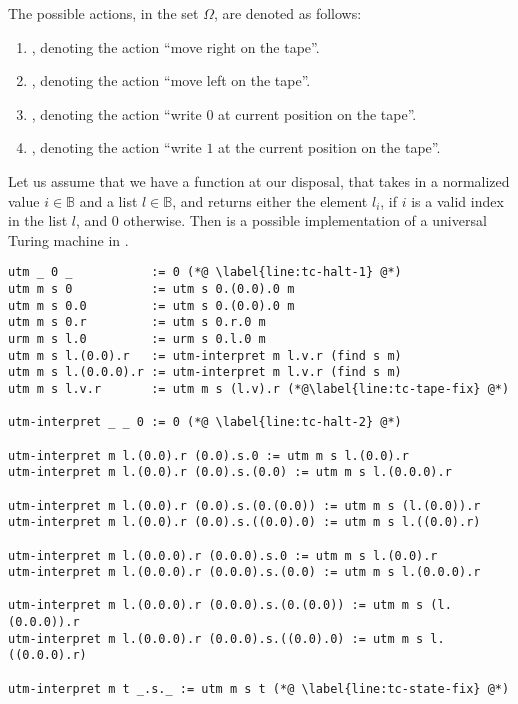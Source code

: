 \begin{definition} The possible actions, in the set $\Omega$, are denoted as follows:

\begin{enumerate}

\item {}, denoting the action ``move right on the tape''.

\item {}, denoting the action ``move left on the tape''.

\item {}, denoting the action ``write $0$ at current position on the
tape''.

\item {}, denoting the action ``write $1$ at the current position on
the tape''.

\end{enumerate}

\end{definition}

Let us assume that we have a function  at our disposal, that takes
in a normalized value $i\in\mathbb{B}$ and a list $l\in\mathbb{B}$, and returns
either the element $l_i$, if $i$ is a valid index in the list $l$, and $0$
otherwise. Then  is a possible
implementation of a universal Turing machine in \D{}.

\begin{lstlisting}[label=listing:turing-completeness,
  caption={A universal Turing machine in \D{}. \mono{m} stands for $M$, \mono{s}
  stands for $\lambda$, \mono{t} stands for tape, and \mono{l} and \mono{r}
  stand for left and right, respectively.}]
utm _ 0 _           := 0 (*@ \label{line:tc-halt-1} @*)
utm m s 0           := utm s 0.(0.0).0 m
utm m s 0.0         := utm s 0.(0.0).0 m
utm m s 0.r         := utm s 0.r.0 m
urm m s l.0         := urm s 0.l.0 m
utm m s l.(0.0).r   := utm-interpret m l.v.r (find s m)
utm m s l.(0.0.0).r := utm-interpret m l.v.r (find s m)
utm m s l.v.r       := utm m s (l.v).r (*@\label{line:tc-tape-fix} @*)

utm-interpret _ _ 0 := 0 (*@ \label{line:tc-halt-2} @*)

utm-interpret m l.(0.0).r (0.0).s.0 := utm m s l.(0.0).r
utm-interpret m l.(0.0).r (0.0).s.(0.0) := utm m s l.(0.0.0).r

utm-interpret m l.(0.0).r (0.0).s.(0.(0.0)) := utm m s (l.(0.0)).r
utm-interpret m l.(0.0).r (0.0).s.((0.0).0) := utm m s l.((0.0).r)

utm-interpret m l.(0.0.0).r (0.0.0).s.0 := utm m s l.(0.0).r
utm-interpret m l.(0.0.0).r (0.0.0).s.(0.0) := utm m s l.(0.0.0).r

utm-interpret m l.(0.0.0).r (0.0.0).s.(0.(0.0)) := utm m s (l.(0.0.0)).r
utm-interpret m l.(0.0.0).r (0.0.0).s.((0.0).0) := utm m s l.((0.0.0).r)

utm-interpret m t _.s._ := utm m s t (*@ \label{line:tc-state-fix} @*)
\end{lstlisting}

